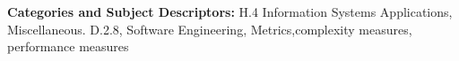 \documentclass{sig-alternate}
\begin{document}
\vspace{1mm}
\noindent
{\bf Categories and Subject Descriptors:} H.4 Information Systems Applications, Miscellaneous.
D.2.8, Software Engineering, Metrics,complexity measures, performance measures



\vspace*{0.5mm}
\scriptsize



\balance
\end{document}
